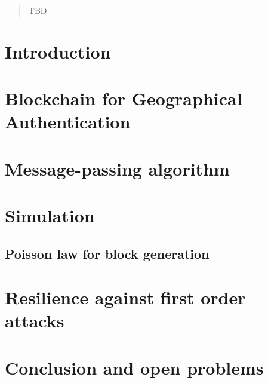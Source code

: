 \documentclass{article}
\begin{document}
\begin{abstract}
	TBD
\end{abstract}

\section{Introduction}

\section{Blockchain for Geographical Authentication}

\section{Message-passing algorithm}

\section{Simulation}
\subsection{Poisson law for block generation}


\section{Resilience against first order attacks}

\section{Conclusion and open problems}



\end{document}
